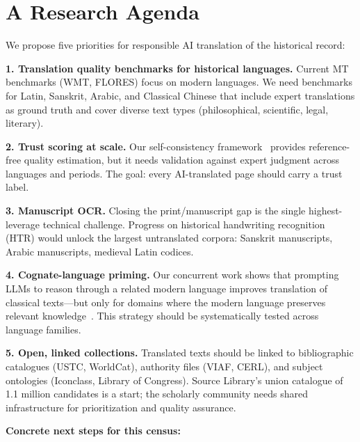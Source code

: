 \documentclass[10pt,twocolumn]{article}
\begin{document}
\section{A Research Agenda}

We propose five priorities for responsible AI translation of the historical record:

\textbf{1. Translation quality benchmarks for historical languages.} Current MT benchmarks (WMT, FLORES) focus on modern languages. We need benchmarks for Latin, Sanskrit, Arabic, and Classical Chinese that include expert translations as ground truth and cover diverse text types (philosophical, scientific, legal, literary).

\textbf{2. Trust scoring at scale.} Our self-consistency framework~\cite{lomas2026ocr} provides reference-free quality estimation, but it needs validation against expert judgment across languages and periods. The goal: every AI-translated page should carry a trust label.

\textbf{3. Manuscript OCR.} Closing the print/manuscript gap is the single highest-leverage technical challenge. Progress on historical handwriting recognition (HTR) would unlock the largest untranslated corpora: Sanskrit manuscripts, Arabic manuscripts, medieval Latin codices.

\textbf{4. Cognate-language priming.} Our concurrent work shows that prompting LLMs to reason through a related modern language improves translation of classical texts---but only for domains where the modern language preserves relevant knowledge~\cite{lomas2026sanskrit}. This strategy should be systematically tested across language families.

\textbf{5. Open, linked collections.} Translated texts should be linked to bibliographic catalogues (USTC, WorldCat), authority files (VIAF, CERL), and subject ontologies (Iconclass, Library of Congress). Source Library's union catalogue of 1.1 million candidates is a start; the scholarly community needs shared infrastructure for prioritization and quality assurance.

\textbf{Concrete next steps for this census:}
\end{document}
